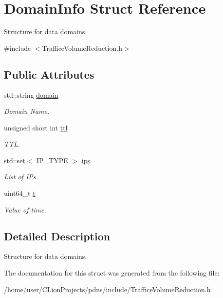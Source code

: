 \hypertarget{structDomainInfo}{}\section{Domain\+Info Struct Reference}
\label{structDomainInfo}


Structure for data domains.  




{\ttfamily \#include $<$Traffice\+Volume\+Reduction.\+h$>$}

\subsection*{Public Attributes}
\begin{DoxyCompactItemize}
\item 
\mbox{\label{structDomainInfo_a5477a844a2c05a72fec2f7990bd7fc63}} 
std\+::string \hyperlink{structDomainInfo_a5477a844a2c05a72fec2f7990bd7fc63}{domain}
\begin{DoxyCompactList}\small\item\em Domain Name. \end{DoxyCompactList}\item 
\mbox{\label{structDomainInfo_a8e5f41ab5d9877e5c76f4620d32c2fbe}} 
unsigned short int \hyperlink{structDomainInfo_a8e5f41ab5d9877e5c76f4620d32c2fbe}{ttl}
\begin{DoxyCompactList}\small\item\em T\+TL. \end{DoxyCompactList}\item 
\mbox{\label{structDomainInfo_a5a43c01e33681dcb29933dedc330d33b}} 
std\+::set$<$ I\+P\+\_\+\+T\+Y\+PE $>$ \hyperlink{structDomainInfo_a5a43c01e33681dcb29933dedc330d33b}{ips}
\begin{DoxyCompactList}\small\item\em List of I\+Ps. \end{DoxyCompactList}\item 
\mbox{\label{structDomainInfo_a9f5c00b47f82b80475d7a7a3fdf2ddaa}} 
uint64\+\_\+t \hyperlink{structDomainInfo_a9f5c00b47f82b80475d7a7a3fdf2ddaa}{t}
\begin{DoxyCompactList}\small\item\em Value of time. \end{DoxyCompactList}\end{DoxyCompactItemize}


\subsection{Detailed Description}
Structure for data domains. 

The documentation for this struct was generated from the following file\+:\begin{DoxyCompactItemize}
\item 
/home/user/\+C\+Lion\+Projects/pdns/include/Traffice\+Volume\+Reduction.\+h\end{DoxyCompactItemize}
